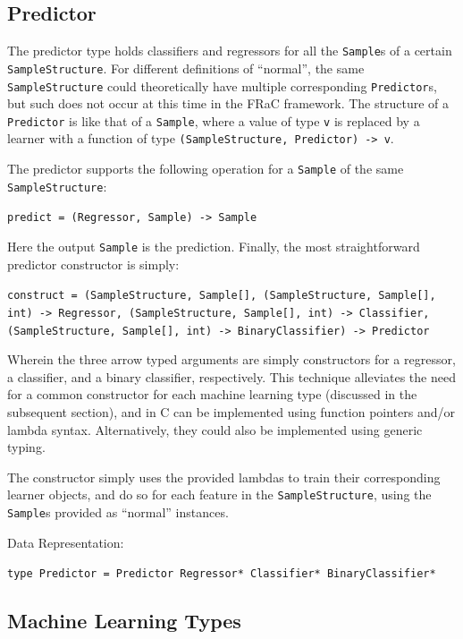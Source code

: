 \documentclass{article}
\newcommand{\CC}{C\nolinebreak\hspace{-.05em}\raisebox{.4ex}{\tiny\bf +}\nolinebreak\hspace{-.10em}\raisebox{.4ex}{\tiny\bf +}}
\begin{document}
\begin{multicols}{2}
\subsection{Predictor}

The predictor type holds classifiers and regressors for all the \texttt{Sample}s of a certain \texttt{SampleStructure}.  For different definitions of ``normal'', the same \texttt{SampleStructure} could theoretically have multiple corresponding \texttt{Predictor}s, but such does not occur at this time in the FRaC framework.  The structure of a \texttt{Predictor} is like that of a \texttt{Sample}, where a value of type \texttt{v} is replaced by a learner with a function of type \texttt{(SampleStructure, Predictor) -> v}.

\par\bigskip

The predictor supports the following operation for a \texttt{Sample} of the same \texttt{SampleStructure}:

\texttt{predict = (Regressor, Sample) -> Sample}

Here the output \texttt{Sample} is the prediction.  Finally, the most straightforward predictor constructor is simply:

\texttt{construct = (SampleStructure, Sample[], (SampleStructure, Sample[], int) -> Regressor, (SampleStructure, Sample[], int) -> Classifier, (SampleStructure, Sample[], int) -> BinaryClassifier) -> Predictor}

Wherein the three arrow typed arguments are simply constructors for a regressor, a classifier, and a binary classifier, respectively.  This technique alleviates the need for a common constructor for each machine learning type (discussed in the subsequent section), and in \CC{} can be implemented using function pointers and/or lambda syntax.  Alternatively, they could also be implemented using generic typing.

The constructor simply uses the provided lambdas to train their corresponding learner objects, and do so for each feature in the \texttt{SampleStructure}, using the \texttt{Sample}s provided as ``normal'' instances.

\par\bigskip
Data Representation:

\texttt{type Predictor = Predictor Regressor* Classifier* BinaryClassifier*}

\subsection{Machine Learning Types}


\end{multicols}
\end{document}
